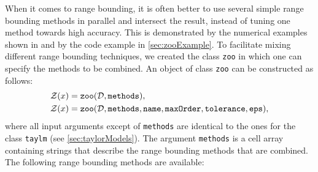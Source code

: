  \label{sec:zoo}

When it comes to range bounding, it is often better to use several simple range bounding methods in parallel and intersect the result, instead of tuning one method towards high accuracy. This is demonstrated by the numerical examples shown in \cite{Althoff2018b} and by the code example in \cref{sec:zooExample}. To facilitate mixing different range bounding techniques, we created the class \texttt{zoo} in which one can specify the methods to be combined. An object of class \texttt{zoo} can be constructed as follows:
\begin{equation*}
	\begin{split}
		& \mathcal{Z}(x) = {\normalfont \texttt{zoo}}(\mathcal{D},\texttt{methods}), \\
		& \mathcal{Z}(x) = {\normalfont \texttt{zoo}}(\mathcal{D},\texttt{methods},\texttt{name},\texttt{maxOrder},\texttt{tolerance},\texttt{eps}),
	\end{split}
\end{equation*}
where all input arguments except of \texttt{methods} are identical to the ones for the class \texttt{taylm} (see \cref{sec:taylorModels}). The argument \texttt{methods} is a cell array containing strings that describe the range bounding methods that are combined. The following range bounding methods are available:

